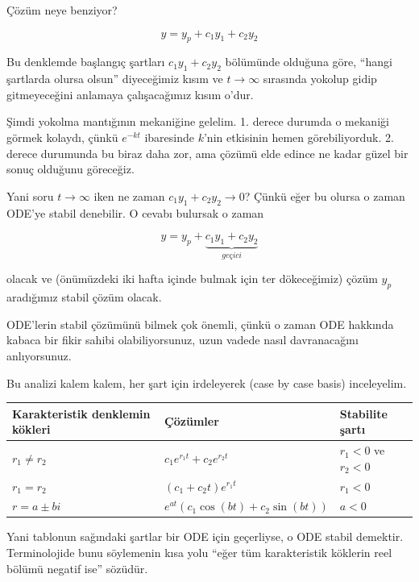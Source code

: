 \documentclass[12pt,fleqn]{article}\usepackage{../../common}
\begin{document}
Çözüm neye benziyor? 

$$ y = y_p + c_1y_1 + c_2y_2 $$

Bu denklemde başlangıç şartları $c_1y_1 + c_2y_2 $ bölümünde olduğuna göre,
``hangi şartlarda olursa olsun'' diyeceğimiz kısım ve $t \to \infty$ sırasında
yokolup gidip gitmeyeceğini anlamaya çalışacağımız kısım o'dur.

Şimdi yokolma mantığının mekaniğine gelelim. 1. derece durumda o mekaniği görmek
kolaydı, çünkü $e^{-kt}$ ibaresinde $k$'nin etkisinin hemen
görebiliyorduk. 2. derece durumunda bu biraz daha zor, ama çözümü elde edince ne
kadar güzel bir sonuç olduğunu göreceğiz.

Yani soru $t \to \infty$ iken ne zaman $c_1y_1 + c_2y_2 \to 0$? Çünkü eğer bu
olursa o zaman ODE'ye stabil denebilir. O cevabı bulursak o zaman

$$ y = y_p + \underbrace{c_1y_1 + c_2y_2}_{geçici} $$

olacak ve (önümüzdeki iki hafta içinde bulmak için ter dökeceğimiz) çözüm $y_p$
aradığımız stabil çözüm olacak.

ODE'lerin stabil çözümünü bilmek çok önemli, çünkü o zaman ODE hakkında kabaca
bir fikir sahibi olabiliyorsunuz, uzun vadede nasıl davranacağını anlıyorsunuz.

Bu analizi kalem kalem, her şart için irdeleyerek (case by case basis)
inceleyelim.

\begin{tabular}{l|l|l}
\hline
Karakteristik denklemin kökleri &  Çözümler & Stabilite şartı  \\ 
\hline
$r_1 \ne r_2$ &  $c_1e^{r_1t} + c_2e^{r_2t}$ & $r_1 < 0$ ve $r_2 < 0$ \\ 
\hline
$r_1 = r_2$ &  $(c_1 + c_2t)e^{r_1t}$ & $r_1 < 0$  \\ 
\hline
$r = a \pm bi$ &  $e^{at}(c_1\cos(bt) + c_2\sin(bt))$ & $a < 0$  \\
\hline
\end{tabular}

Yani tablonun sağındaki şartlar bir ODE için geçerliyse, o ODE stabil
demektir. Terminolojide bunu söylemenin kısa yolu ``eğer tüm karakteristik
köklerin reel bölümü negatif ise'' sözüdür.
\end{document}
